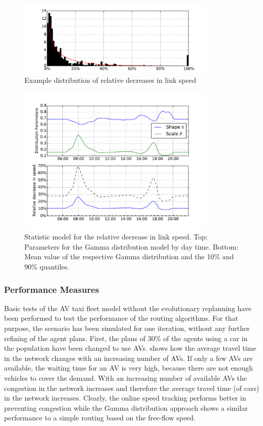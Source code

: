 \begin{figure}
    \centering
    \includegraphics[width=0.85\textwidth]{figures/speeddecdist.pdf}
    \caption{Example distribution of relative decreases in link speed}
    \label{fig:speeddecdist}
\end{figure}

\begin{figure}
    \centering
    \includegraphics[width=0.85\textwidth]{figures/randommodel.pdf}
    \caption{Statistic model for the relative decrease in link speed. Top: Parameters
    for the Gamma distribution model by day time. Bottom: Mean value of the respective
    Gamma distribution and the 10\% and 90\% quantiles.}
    \label{fig:randommodel}
\end{figure}

\subsubsection{Performance Measures}

Basic tests of the AV taxi fleet model without the evolutionary replanning have been performed to test the
performance of the routing algorithms. For that purpose, the scenario has been
simulated for one iteration, without any further refining of the agent plans.
First, the plans of 30\% of the agents using a car in the population have been
changed to use AVs.  shows how
the average travel time in the network changes with an increasing number of AVs.
If only a few AVs are available, the waiting time for an AV is very high, because
there are not enough vehicles to cover the demand. With an increasing number of
available AVs the congestion in the network increases and therefore the average
travel time (of cars) in the network increases. Clearly, the online speed tracking performs
better in preventing congestion while the Gamma distribution approach shows a
similar performance to a simple routing based on the free-flow speed.

